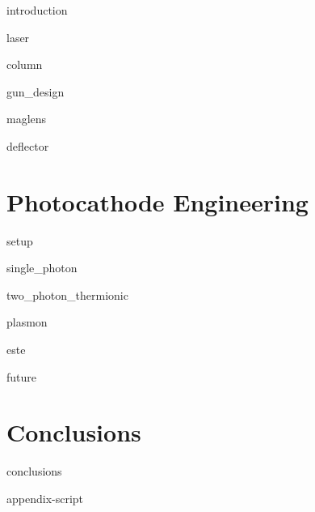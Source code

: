 \documentclass{uicthesi}
\begin{document}
  {introduction}

  {laser}

  {column}

  {gun_design}

  {maglens}

  {deflector}

\chapter{Photocathode Engineering} \label{chap:photocathode}

  {setup}

  {single_photon}

  {two_photon_thermionic}

  {plasmon}

  {este}

  {future}

\chapter{Conclusions}

  {conclusions}

\appendix
  {appendix-script}

\newpage


\end{document}
